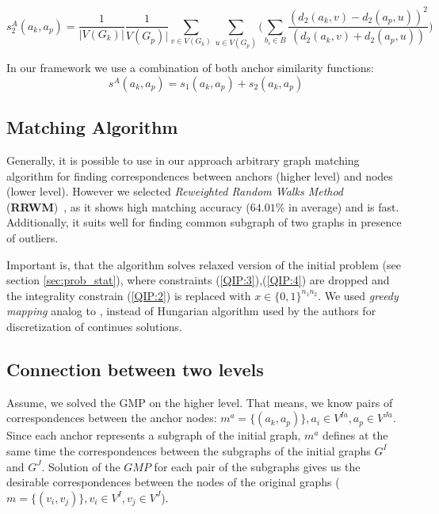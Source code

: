\begin{equation}
s^A_2(a_k, a_p) = \frac{1}{|V(G_k)|}\frac{1}{V(G_p)|}\sum_{v\in V(G_k)}\sum_{u\in V(G_p)} \big(\sum_{b_i\in B}\frac{(d_2(a_k,v)-d_2(a_p,u))^2}{(d_2(a_k,v)+d_2(a_p,u))}\big)
\end{equation}

In our framework we use a combination of both anchor similarity functions:
\begin{equation}
s^A(a_k, a_p) = s_1(a_k, a_p)+s_2(a_k, a_p) 
\end{equation}


\subsection{Matching Algorithm}

Generally, it is possible to use in our approach arbitrary graph matching algorithm for finding correspondences between anchors (higher level) and nodes (lower level). However we selected \emph{Reweighted Random Walks Method} (\textbf{RRWM})~\cite{Cho2010_RRWM}, as it shows high matching accuracy ($64.01\%$ in average) and is fast. Additionally, it	 suits well for finding common subgraph of two graphs in presence of outliers.

Important is, that the algorithm solves relaxed version of the initial problem (see section \ref{sec:prob_stat}), where constraints (\ref{QIP:3}),(\ref{QIP:4}) are dropped and the integrality constrain (\ref{QIP:2}) is replaced with $x\in \{0,1\}^{n_1n_2}$. We used \emph{greedy mapping} analog to \cite{Leordeanu2005}, instead of Hungarian algorithm used by the authors for discretization of continues solutions.

\subsection{Connection between two levels}
Assume, we solved the GMP on the higher level. That means, we know pairs of correspondences between the anchor nodes: $m^a = \{(a_k, a_p)\}, a_i\in V^{Ia}, a_p\in V^{Ja}$. Since each anchor represents a subgraph of the initial graph, $m^a$ defines at the same time the correspondences between the subgraphs of the initial graphs $G^I$ and $G^J$. Solution of the $GMP$ for each pair of the subgraphs gives us the desirable correspondences between the nodes of the original graphs ($m = \{(v_i, v_j)\}, v_i\in V^{I}, v_j\in V^{J}$).

